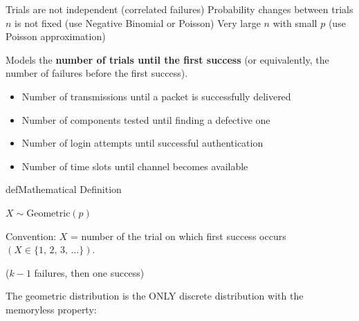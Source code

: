 
\PSno{} Trials are not independent (correlated failures)\PSbr{}\PSno{} Probability changes between trials\PSbr{}\PSno{} $n$ is not fixed (use Negative Binomial or Poisson)\PSbr{}\PSno{} Very large $n$ with small $p$ (use Poisson approximation)



Models the \textbf{number of trials until the first success} (or equivalently, the number of failures before the first success).


\begin{itemize}
\tightlist
\item
  Number of transmissions until a packet is successfully delivered
\item
  Number of components tested until finding a defective one
\item
  Number of login attempts until successful authentication
\item
  Number of time slots until channel becomes available
\end{itemize}

\begin{PSbox}[unbreakable]{def}{Mathematical Definition}

$X \sim \mathrm{Geometric}(p)$

Convention: $X$ = number of the trial on which first success occurs $(X \in \{1,\, 2,\, 3,\, \ldots \})$.

\end{PSbox}



($k-1$ failures, then one success)








The geometric distribution is the ONLY discrete distribution with the memoryless property:


